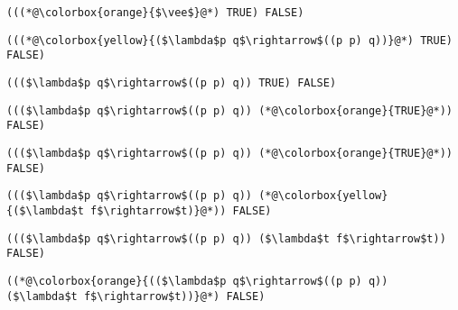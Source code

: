 \documentclass{beamer}
\begin{document}
\begin{frame}[fragile]{\CurrentSection}
\lstset{basicstyle=\ttfamily\small}\lstset{numbers=none}\lstset{language=ML}\begin{lstlisting}
(((*@\colorbox{orange}{$\vee$}@*) TRUE) FALSE)
\end{lstlisting}
\pause\lstset{language=ML}\begin{lstlisting}
(((*@\colorbox{yellow}{($\lambda$p q$\rightarrow$((p p) q))}@*) TRUE) FALSE)
\end{lstlisting}

\end{frame}

\begin{frame}[fragile]{\CurrentSection}
\lstset{basicstyle=\ttfamily\small}\lstset{numbers=none}\lstset{language=ML}\begin{lstlisting}
((($\lambda$p q$\rightarrow$((p p) q)) TRUE) FALSE)
\end{lstlisting}
\pause\lstset{language=ML}\begin{lstlisting}
((($\lambda$p q$\rightarrow$((p p) q)) (*@\colorbox{orange}{TRUE}@*)) FALSE)
\end{lstlisting}

\end{frame}

\begin{frame}[fragile]{\CurrentSection}
\lstset{basicstyle=\ttfamily\small}\lstset{numbers=none}\lstset{language=ML}\begin{lstlisting}
((($\lambda$p q$\rightarrow$((p p) q)) (*@\colorbox{orange}{TRUE}@*)) FALSE)
\end{lstlisting}
\pause\lstset{language=ML}\begin{lstlisting}
((($\lambda$p q$\rightarrow$((p p) q)) (*@\colorbox{yellow}{($\lambda$t f$\rightarrow$t)}@*)) FALSE)
\end{lstlisting}

\end{frame}

\begin{frame}[fragile]{\CurrentSection}
\lstset{basicstyle=\ttfamily\small}\lstset{numbers=none}\lstset{language=ML}\begin{lstlisting}
((($\lambda$p q$\rightarrow$((p p) q)) ($\lambda$t f$\rightarrow$t)) FALSE)
\end{lstlisting}
\pause\lstset{language=ML}\begin{lstlisting}
((*@\colorbox{orange}{(($\lambda$p q$\rightarrow$((p p) q)) ($\lambda$t f$\rightarrow$t))}@*) FALSE)
\end{lstlisting}

\end{frame}
\end{document}
